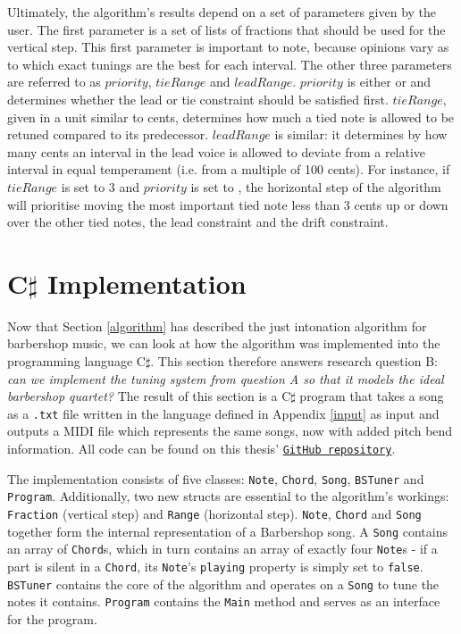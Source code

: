 \documentclass[a4paper]{article}
\begin{document}
Ultimately, the algorithm's results depend on a set of parameters given by the user. The first parameter is a set of lists of fractions that should be used for the vertical step. This first parameter is important to note, because opinions vary as to which exact tunings are the best for each interval. The other three parameters are referred to as $\mathit{priority}$, $\mathit{tieRange}$ and $\mathit{leadRange}$. $\mathit{priority}$ is either  or  and determines whether the lead or tie constraint should be satisfied first. $\mathit{tieRange}$, given in a unit similar to cents, determines how much a tied note is allowed to be retuned compared to its predecessor. $\mathit{leadRange}$ is similar: it determines by how many cents an interval in the lead voice is allowed to deviate from a relative interval in equal temperament (i.e. from a multiple of 100 cents). For instance, if $\mathit{tieRange}$ is set to 3 and $\mathit{priority}$ is set to , the horizontal step of the algorithm will prioritise moving the most important tied note less than 3 cents up or down over the other tied notes, the lead constraint and the drift constraint.

\section{C$\sharp$ Implementation}
\label{implementation}
Now that Section \ref{algorithm} has described the just intonation algorithm for barbershop music, we can look at how the algorithm was implemented into the programming language C$\sharp$. This section therefore answers research question B: {\it can we implement the tuning system from question A so that it models the ideal barbershop quartet?} The result of this section is a C$\sharp$ program that takes a song as a \texttt{.txt} file written in the language defined in Appendix \ref{input} as input and outputs a MIDI file which represents the same songs, now with added pitch bend information. All code can be found on this thesis' \texttt{\href{https://GitHub.com/teuncb/AdaptiveBarbershop}{GitHub repository}}.

The implementation consists of five classes: \texttt{Note}, \texttt{Chord}, \texttt{Song}, \texttt{BSTuner} and \texttt{Program}. Additionally, two new structs are essential to the algorithm's workings: \texttt{Fraction} (vertical step) and \texttt{Range} (horizontal step). \texttt{Note}, \texttt{Chord} and \texttt{Song} together form the internal representation of a Barbershop song. A \texttt{Song} contains an array of \texttt{Chord}s, which in turn contains an array of exactly four \texttt{Note}s - if a part is silent in a \texttt{Chord}, its \texttt{Note}'s \texttt{playing} property is simply set to \texttt{false}. \texttt{BSTuner} contains the core of the algorithm and operates on a \texttt{Song} to tune the notes it contains. \texttt{Program} contains the \texttt{Main} method and serves as an interface for the program.
\end{document}
